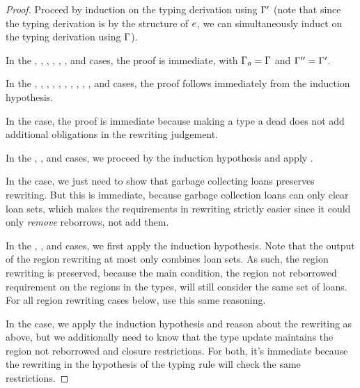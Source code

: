 \begin{proof}
  Proceed by induction on the typing derivation using $\Gamma^\prime$ (note
  that since the typing derivation is by the structure of $e$, we can
  simultaneously induct on the typing derivation using $\Gamma$).

  In the , , ,
  , , , and  cases,
  the proof is immediate, with $\Gamma_o = \Gamma$ and
  $\Gamma^{\prime\prime} = \Gamma^\prime$.

  In the , , ,
  , , ,
  , , , , and
   cases, the proof follows immediately from the induction
  hypothesis.

  In the  case, the proof is immediate because making a type a
  dead does not add additional obligations in the rewriting judgement.

  In the , , and 
  cases, we proceed by the induction hypothesis and apply
  .

  In the  case, we just need to show that garbage collecting loans
  preserves rewriting. But this is immediate, because garbage collection loans
  can only clear loan sets, which makes the requirements in rewriting strictly
  easier since it could only \emph{remove} reborrows, not add them.

  In the , , and
   cases, we first apply the induction hypothesis. Note
  that the output of the region rewriting at most only combines loan sets. As
  such, the region rewriting is preserved, because the main condition, the
  region not reborrowed requirement on the regions in the types, will still
  consider the same set of loans. For all region rewriting cases below, use this
  same reasoning.

  In the  case, we apply the induction hypothesis and reason
  about the rewriting as above, but we additionally need to know that the type
  update maintains the region not reborrowed and closure restrictions. For both,
  it's immediate because the rewriting in the hypothesis of the typing rule will
  check the same restrictions.


\end{proof}
